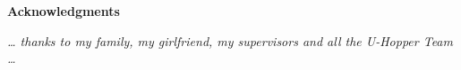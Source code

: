 \thispagestyle{empty}

\begin{center}
  {\bf \Huge Acknowledgments}
\end{center}

\vspace{4cm}


\emph{
  \dots{ thanks to my family, my girlfriend, my supervisors and all the U-Hopper Team }\dots
}
